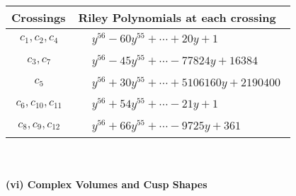 \documentclass[1p]{elsarticle_modified}
\theoremstyle{definition}
\begin{document}
\begin{tabular}{m{50pt}|m{274pt}}
Crossings & \hspace{64pt}Riley Polynomials at each crossing \\
\hline $$\begin{aligned}c_{1},c_{2},c_{4}\end{aligned}$$&$\begin{aligned}
&y^{56}-60 y^{55}+\cdots+20 y+1
\end{aligned}$\\
\hline $$\begin{aligned}c_{3},c_{7}\end{aligned}$$&$\begin{aligned}
&y^{56}-45 y^{55}+\cdots-77824 y+16384
\end{aligned}$\\
\hline $$\begin{aligned}c_{5}\end{aligned}$$&$\begin{aligned}
&y^{56}+30 y^{55}+\cdots+5106160 y+2190400
\end{aligned}$\\
\hline $$\begin{aligned}c_{6},c_{10},c_{11}\end{aligned}$$&$\begin{aligned}
&y^{56}+54 y^{55}+\cdots-21 y+1
\end{aligned}$\\
\hline $$\begin{aligned}c_{8},c_{9},c_{12}\end{aligned}$$&$\begin{aligned}
&y^{56}+66 y^{55}+\cdots-9725 y+361
\end{aligned}$\\
\hline
\end{tabular}\\~\\
\newpage\flushleft \textbf{(vi) Complex Volumes and Cusp Shapes}
\end{document}
